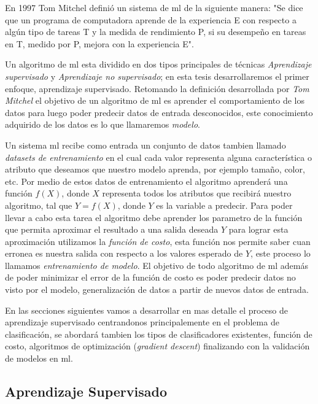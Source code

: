 En 1997 Tom Mitchel \citep{Mitchell} definió un sistema de \ac{ml} de la siguiente manera: "Se dice que un programa de computadora aprende de la experiencia E con respecto a algún tipo de tareas T y la medida de rendimiento P, si su desempeño en tareas en T, medido por P, mejora con la experiencia E". 

Un algoritmo de \ac{ml} esta dividido en dos tipos principales de técnicas \textit{Aprendizaje supervisado} y \textit{Aprendizaje no supervisado}; en esta tesis desarrollaremos el primer enfoque, aprendizaje supervisado. Retomando la definición desarrollada por \textit{Tom Mitchel} el objetivo de un algoritmo de \ac{ml} es aprender el comportamiento de los datos para luego poder predecir datos de entrada desconocidos, este conocimiento adquirido de los datos es lo que llamaremos \textit{modelo}. 

Un sistema \ac{ml} recibe como entrada un conjunto de datos tambien llamado \textit{datasets de entrenamiento} en el cual cada valor representa alguna característica o atributo que deseamos que nuestro modelo aprenda, por ejemplo tamaño, color, etc. Por medio de estos datos de entrenamiento el algoritmo aprenderá una función $ f(X)$, donde $ X$ representa todos los atributos que recibirá nuestro algoritmo, tal que $Y = f(X)$, donde $ Y$ es la variable a predecir. Para poder llevar a cabo esta tarea el algoritmo debe aprender los parametro de la función que permita aproximar el resultado a una salida deseada $ Y$ para lograr esta aproximación  utilizamos la \textit{función de costo}, esta función nos permite saber cuan erronea es nuestra salida con respecto a los valores esperado de $ Y$, este proceso lo llamamos \textit{entrenamiento de modelo}. El objetivo de todo algoritmo de \ac{ml} además de poder minimizar el error de la función de costo es poder predecir datos no visto por el modelo, generalización de datos a partir de nuevos datos de entrada.


En las secciones siguientes vamos a desarrollar en mas  detalle el proceso de aprendizaje supervisado centrandonos principalemente en el problema de clasificación, se abordará tambien los tipos de clasificadores existentes, función de costo,  algoritmos de optimización (\textit{gradient descent}) finalizando con la validación de modelos en \ac{ml}.

\subsection{Aprendizaje Supervisado}\label{sub:aprendizaje_supervisado}

